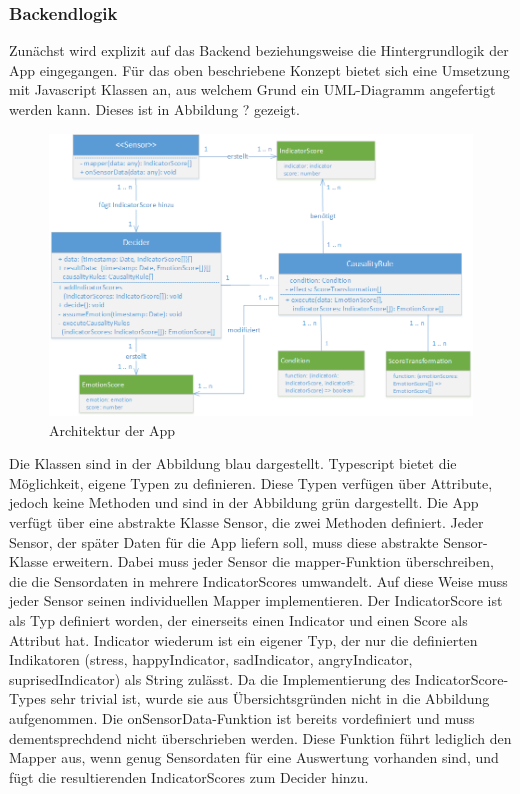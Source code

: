\subsubsection{Backendlogik}
Zunächst wird explizit auf das Backend beziehungsweise die Hintergrundlogik der App eingegangen. Für das oben beschriebene Konzept bietet sich eine Umsetzung mit Javascript Klassen an, aus welchem Grund ein UML-Diagramm angefertigt werden kann. Dieses ist in Abbildung ? gezeigt. \newline
\begin{figure}[h]
	\centering
	\includegraphics[width=16cm]{Bilder/architecture.png}
	\caption[Architektur der App]{Architektur der App}
\end{figure}%
Die Klassen sind in der Abbildung blau dargestellt. Typescript bietet die Möglichkeit, eigene Typen zu definieren. Diese Typen verfügen über Attribute, jedoch keine Methoden und sind in der Abbildung grün dargestellt. \newline \newline
Die App verfügt über eine abstrakte Klasse Sensor, die zwei Methoden definiert. Jeder Sensor, der später Daten für die App liefern soll, muss diese abstrakte Sensor-Klasse erweitern. Dabei muss jeder Sensor die mapper-Funktion überschreiben, die die Sensordaten in mehrere IndicatorScores umwandelt. Auf diese Weise muss jeder Sensor seinen individuellen Mapper implementieren. Der IndicatorScore ist als Typ definiert worden, der einerseits einen Indicator und einen Score als Attribut hat. Indicator wiederum ist ein eigener Typ, der nur die definierten Indikatoren (stress, happyIndicator, sadIndicator, angryIndicator, suprisedIndicator) als String zulässt. Da die Implementierung des IndicatorScore-Types sehr trivial ist, wurde sie aus Übersichtsgründen nicht in die Abbildung aufgenommen. Die onSensorData-Funktion ist bereits vordefiniert und muss dementsprechdend nicht überschrieben werden. Diese Funktion führt lediglich den Mapper aus, wenn genug Sensordaten für eine Auswertung vorhanden sind, und fügt die resultierenden IndicatorScores zum Decider hinzu. \newline \newline
